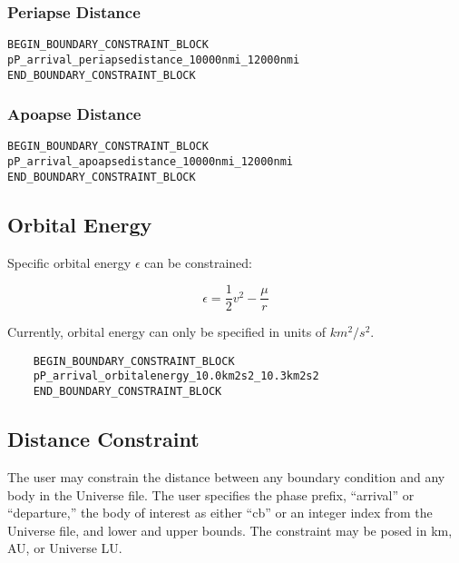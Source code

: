 \documentclass[11pt]{article}
\begin{document}
\subsubsection{Periapse Distance}
\label{sec:boundaryOrbitPeriapse}

\begin{verbatim}
BEGIN_BOUNDARY_CONSTRAINT_BLOCK
pP_arrival_periapsedistance_10000nmi_12000nmi
END_BOUNDARY_CONSTRAINT_BLOCK
\end{verbatim}

\subsubsection{Apoapse Distance}
\label{sec:boundaryOrbitApoapse}

\begin{verbatim}
BEGIN_BOUNDARY_CONSTRAINT_BLOCK
pP_arrival_apoapsedistance_10000nmi_12000nmi
END_BOUNDARY_CONSTRAINT_BLOCK
\end{verbatim}

\subsection{Orbital Energy}
\label{sec:orbitalEnergyConstraint}

Specific orbital energy $\epsilon$ can be constrained:

\begin{equation}
	\label{eq:orbital_energy}
	\epsilon = \frac{1}{2}v^2 - \frac{\mu}{r}
\end{equation}

\noindent Currently, orbital energy can only be specified in units of $km^2/s^2$.

\begin{verbatim}
	BEGIN_BOUNDARY_CONSTRAINT_BLOCK
	pP_arrival_orbitalenergy_10.0km2s2_10.3km2s2
	END_BOUNDARY_CONSTRAINT_BLOCK
\end{verbatim}

\subsection{Distance Constraint}
\label{sec:boundaryDistanceConstraint}

The user may constrain the distance between any boundary condition and any body in the Universe file. The user specifies the phase prefix, ``arrival'' or ``departure,'' the body of interest as either ``cb'' or an integer index from the Universe file, and lower and upper bounds. The constraint may be posed in km, AU, or Universe LU.
\end{document}

